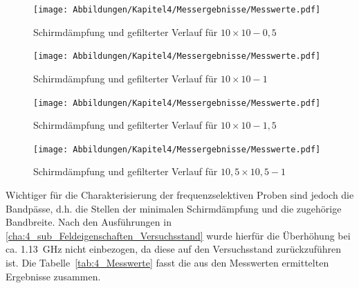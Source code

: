 \begin{figure}[H]
    \centering
    \texttt{[image: Abbildungen/Kapitel4/Messergebnisse/Messwerte.pdf]}
    \caption{Schirmdämpfung und gefilterter Verlauf für $10\times10-0,5$}
    \label{fig:4_Schirmdämpfung_10x10-0k5}
\end{figure}

\begin{figure}[H]
    \centering
    \texttt{[image: Abbildungen/Kapitel4/Messergebnisse/Messwerte.pdf]}
    \caption{Schirmdämpfung und gefilterter Verlauf für $10\times10-1$}
    \label{fig:4_Schirmdämpfung_10x10-1}
\end{figure}

\begin{figure}[H]
    \centering
    \texttt{[image: Abbildungen/Kapitel4/Messergebnisse/Messwerte.pdf]}
    \caption{Schirmdämpfung und gefilterter Verlauf für $10\times10-1,5$}
    \label{fig:4_Schirmdämpfung_10x10-1k5}
\end{figure}

\begin{figure}[H]
    \centering
    \texttt{[image: Abbildungen/Kapitel4/Messergebnisse/Messwerte.pdf]}
    \caption{Schirmdämpfung und gefilterter Verlauf für $10,5\times10,5-1$}
    \label{fig:4_Schirmdämpfung_10k5x10k5-1}
\end{figure}

\newpage

Wichtiger für die Charakterisierung der frequenzselektiven Proben sind jedoch die Bandpässe, d.h. die Stellen der minimalen Schirmdämpfung und die zugehörige Bandbreite. Nach den Ausführungen in \Abschnitt\ref{cha:4_sub_Feldeigenschaften_Versuchsstand} wurde hierfür die Überhöhung bei ca. \SI{1.13}{\giga\hertz} nicht einbezogen, da diese auf den Versuchsstand zurückzuführen ist. Die Tabelle~\ref{tab:4_Messwerte} fasst die aus den Messwerten ermittelten Ergebnisse zusammen. 
\par
\vspace{\linespace}

